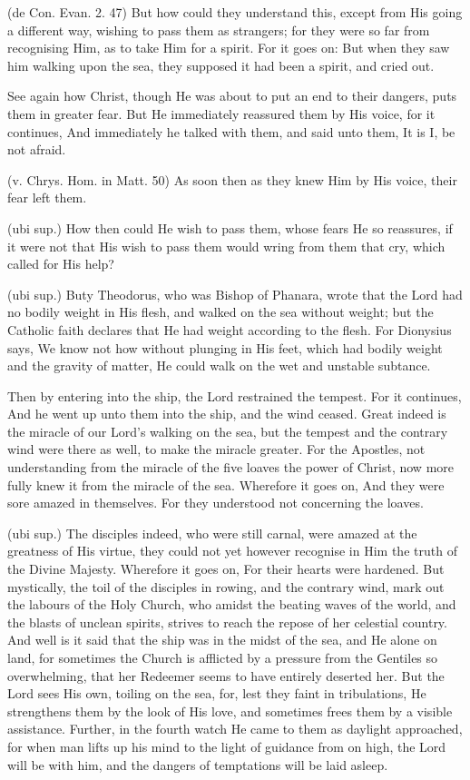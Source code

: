  (de Con. Evan. 2. 47) But how could they understand this, except from His going a different way, wishing to pass them as strangers; for they were so far from recognising Him, as to take Him for a spirit. For it goes on: But when they saw him walking upon the sea, they supposed it had been a spirit, and cried out.

 See again how Christ, though He was about to put an end to their dangers, puts them in greater fear. But He immediately reassured them by His voice, for it continues, And immediately he talked with them, and said unto them, It is I, be not afraid.

 (v. Chrys. Hom. in Matt. 50) As soon then as they knew Him by His voice, their fear left them.

 (ubi sup.) How then could He wish to pass them, whose fears He so reassures, if it were not that His wish to pass them would wring from them that cry, which called for His help?

 (ubi sup.) Buty Theodorus, who was Bishop of Phanara, wrote that the Lord had no bodily weight in His flesh, and walked on the sea without weight; but the Catholic faith declares that He had weight according to the flesh. For Dionysius says, We know not how without plunging in His feet, which had bodily weight and the gravity of matter, He could walk on the wet and unstable subtance.

 Then by entering into the ship, the Lord restrained the tempest. For it continues, And he went up unto them into the ship, and the wind ceased. Great indeed is the miracle of our Lord’s walking on the sea, but the tempest and the contrary wind were there as well, to make the miracle greater. For the Apostles, not understanding from the miracle of the five loaves the power of Christ, now more fully knew it from the miracle of the sea. Wherefore it goes on, And they were sore amazed in themselves. For they understood not concerning the loaves.

 (ubi sup.) The disciples indeed, who were still carnal, were amazed at the greatness of His virtue, they could not yet however recognise in Him the truth of the Divine Majesty. Wherefore it goes on, For their hearts were hardened. But mystically, the toil of the disciples in rowing, and the contrary wind, mark out the labours of the Holy Church, who amidst the beating waves of the world, and the blasts of unclean spirits, strives to reach the repose of her celestial country. And well is it said that the ship was in the midst of the sea, and He alone on land, for sometimes the Church is afflicted by a pressure from the Gentiles so overwhelming, that her Redeemer seems to have entirely deserted her. But the Lord sees His own, toiling on the sea, for, lest they faint in tribulations, He strengthens them by the look of His love, and sometimes frees them by a visible assistance. Further, in the fourth watch He came to them as daylight approached, for when man lifts up his mind to the light of guidance from on high, the Lord will be with him, and the dangers of temptations will be laid asleep.

